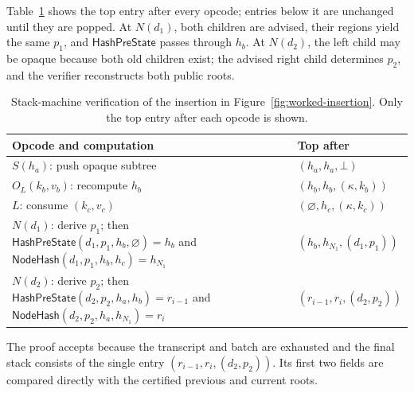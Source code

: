 \documentclass[twocolumn]{article}
\begin{document}
Table~\ref{tab:worked-stack} shows the top entry after every opcode; entries below it are unchanged until they are popped. At $N(d_1)$, both children are advised, their regions yield the same $p_1$, and $\mathsf{HashPreState}$ passes through $h_b$. At $N(d_2)$, the left child may be opaque because both old children exist; the advised right child determines $p_2$, and the verifier reconstructs both public roots.

\begin{table}[H]
\centering
\caption{Stack-machine verification of the insertion in Figure~\ref{fig:worked-insertion}. Only the top entry after each opcode is shown.}
\label{tab:worked-stack}
\footnotesize
\renewcommand{\arraystretch}{1.18}
\begin{tabular}{@{}>{\raggedright\arraybackslash}p{}
                    >{\raggedright\arraybackslash}p{}@{}}
\toprule
\textbf{Opcode and computation} & \textbf{Top after} \\
\midrule
$S(h_a)$: push opaque subtree
  & $(h_a,h_a,\bot)$ \\
$O_L(k_b,v_b)$: recompute $h_b$
  & $(h_b,h_b,(\kappa,k_b))$ \\
$L$: consume $(k_c,v_c)$
  & $(\varnothing,h_c,(\kappa,k_c))$ \\
$N(d_1)$: derive $p_1$; then
  $\mathsf{HashPreState}(d_1,p_1,h_b,\varnothing)=h_b$ and
  $\mathsf{NodeHash}(d_1,p_1,h_b,h_c)=h_{N_1}$
  & $(h_b,h_{N_1},(d_1,p_1))$ \\
$N(d_2)$: derive $p_2$; then
  $\mathsf{HashPreState}(d_2,p_2,h_a,h_b)=r_{i-1}$ and
  $\mathsf{NodeHash}(d_2,p_2,h_a,h_{N_1})=r_i$
  & $(r_{i-1},r_i,(d_2,p_2))$ \\
\bottomrule
\end{tabular}
\end{table}

The proof accepts because the transcript and batch are exhausted and the final stack consists of the single entry $(r_{i-1},r_i,(d_2,p_2))$. Its first two fields are compared directly with the certified previous and current roots.
\end{document}
